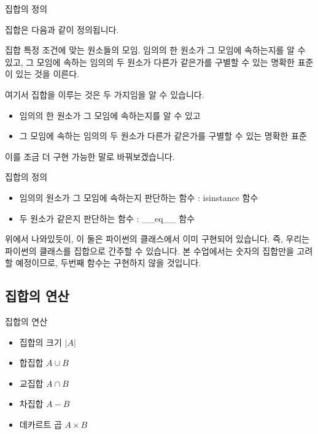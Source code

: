 \documentclass{beamer}
\begin{document}
\begin{frame}{집합의 정의}

집합은 다음과 같이 정의됩니다. 

\begin{block}{집합}
특정 조건에 맞는 원소들의 모임. 임의의 한 원소가 그 모임에 속하는지를 알 수 있고, 그 모임에 속하는 임의의 두 원소가 다른가 같은가를 구별할 수 있는 명확한 표준이 있는 것을 이른다. 
\end{block}

여기서 집합을 이루는 것은 두 가지임을 알 수 있습니다. 

\begin{itemize}
\item 임의의 한 원소가 그 모임에 속하는지를 알 수 있고
\item 그 모임에 속하는 임의의 두 원소가 다른가 같은가를 구별할 수 있는 명확한 표준
\end{itemize}

이를 조금 더 구현 가능한 말로 바꿔보겠습니다. 

\end{frame}

\begin{frame}{집합의 정의}
\begin{itemize}
\item 임의의 원소가 그 모임에 속하는지 판단하는 함수 : isinstance 함수
\item 두 원소가 같은지 판단하는 함수 : \_\_eq\_\_ 함수 
\end{itemize}

위에서 나와있듯이, 이 둘은 파이썬의 클래스에서 이미 구현되어 있습니다. 즉, 우리는 파이썬의 클래스를 집합으로 간주할 수 있습니다. 
본 수업에서는 숫자의 집합만을 고려할 예정이므로, 두번째 함수는 구현하지 않을 것입니다. 
\end{frame}

\subsection{집합의 연산} 
\begin{frame}{집합의 연산}
\begin{itemize}
\item 집합의 크기 $|A|$
\item 합집합 $A \cup B$
\item 교집합 $A \cap B$
\item 차집합 $A-B$
\item 데카르트 곱 $A \times B$
\end{itemize}
\end{frame}
\end{document}

